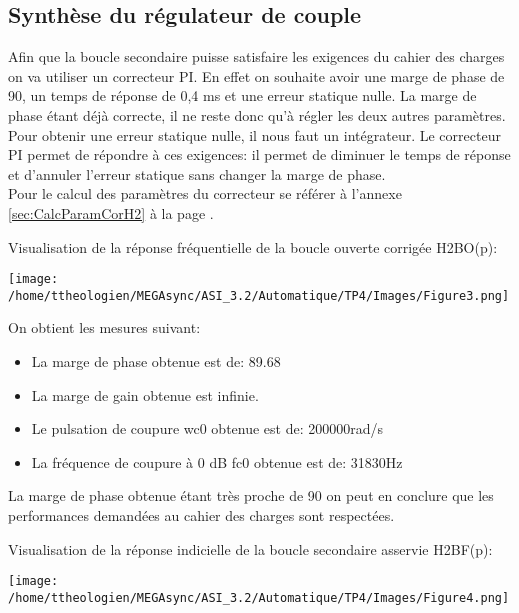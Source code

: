 \documentclass[a4paper,12pt]{article}
\begin{document}
		\subsection{Synthèse du régulateur de couple}
			\par Afin que la boucle secondaire puisse satisfaire les exigences du cahier des charges on va utiliser un correcteur PI.
			En effet on souhaite avoir une marge de phase de 90\degre, un temps de réponse de 0,4 ms et une erreur statique nulle.
			La marge de phase étant déjà correcte, il ne reste donc qu'à régler les deux autres paramètres.
			Pour obtenir une erreur statique nulle, il nous faut un intégrateur. Le correcteur PI permet de répondre à ces exigences: il permet de diminuer le temps de réponse et d'annuler l'erreur statique sans changer la marge de phase.\\
			Pour le calcul des paramètres du correcteur se référer à l'annexe \ref{sec:CalcParamCorH2} à la page \pageref{sec:CalcParamCorH2}.\\

			\par Visualisation de la réponse fréquentielle de la boucle ouverte corrigée H2BO(p):
			\begin{center}
				\texttt{[image: /home/ttheologien/MEGAsync/ASI\_3.2/Automatique/TP4/Images/Figure3.png]}
			\end{center}

			\par On obtient les mesures suivant:
			\begin{itemize}
				\item La marge de phase obtenue est de: 89.68\degre
				\item La marge de gain obtenue est infinie.
				\item Le pulsation de coupure wc0 obtenue est de: 200000rad/s
				\item La fréquence de coupure à 0 dB fc0 obtenue est de: 31830Hz
			\end{itemize}
			La marge de phase obtenue étant très proche de 90 \degre on peut en conclure que les performances demandées au cahier des charges sont respectées.\\

			\par Visualisation de la réponse indicielle de la boucle secondaire asservie H2BF(p):
			\begin{center}
				\texttt{[image: /home/ttheologien/MEGAsync/ASI\_3.2/Automatique/TP4/Images/Figure4.png]}
			\end{center}
\end{document}
